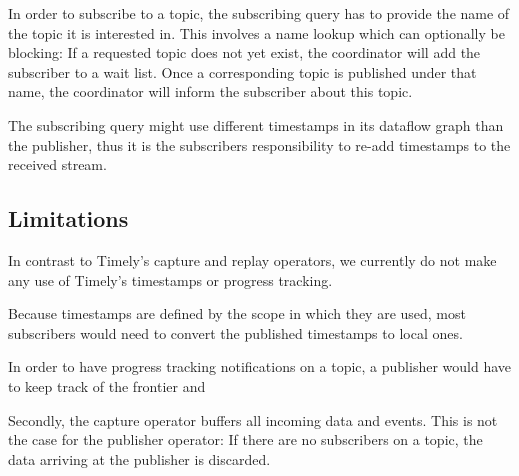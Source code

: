 In order to subscribe to a topic, the subscribing query has to provide the name
of the topic it is interested in. This involves a name lookup which can optionally
be blocking: If a requested topic does not yet exist, the coordinator will add
the subscriber to a wait list. Once a corresponding topic is published under that
name, the coordinator will inform the subscriber about this topic. 

The subscribing query might use different timestamps in its dataflow graph
than the publisher, thus it is the subscribers responsibility to re-add
timestamps to the received stream. 



\subsection{Limitations}

In contrast to Timely's capture and replay operators, we currently do not make
any use of Timely's timestamps or progress tracking. 

Because timestamps are defined by the scope in which they are used, most subscribers would need to
convert the published timestamps to local ones.

In order to have progress tracking notifications on a topic, a publisher would
have to keep track of the frontier and 



Secondly, the capture operator buffers all incoming data and events. This is
not the case for the publisher operator: If there are no subscribers on a topic,
the data arriving at the publisher is discarded.



